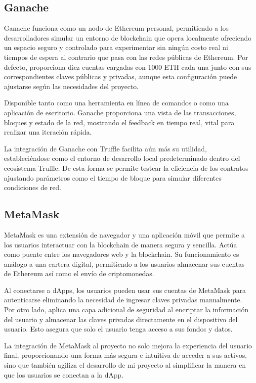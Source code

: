 \subsection{Ganache}

Ganache funciona como un nodo de Ethereum personal, permitiendo a los desarrolladores simular un entorno de blockchain que opera localmente ofreciendo un espacio seguro y controlado para experimentar sin ningún costo real ni tiempos de espera al contrario que pasa con las redes públicas de Ethereum.
Por defecto, proporciona diez cuentas cargadas con 1000 ETH cada una junto con sus correspondientes claves públicas y privadas, aunque esta configuración puede ajustarse según las necesidades del proyecto.

Disponible tanto como una herramienta en línea de comandos o como una aplicación de escritorio. Ganache proporciona  una vista de las transacciones, bloques y estado de la red, mostrando el feedback en tiempo real, vital para realizar una iteración rápida.

La integración de Ganache con Truffle facilita aún más su utilidad, estableciéndose como el entorno de desarrollo local predeterminado dentro del ecosistema Truffle.
De esta forma se permite testear la eficiencia de los contratos ajustando parámetros como el tiempo de bloque para simular diferentes condiciones de red.


\subsection{MetaMask}

MetaMask es una extensión de navegador y una aplicación móvil que permite a los usuarios interactuar con la blockchain de manera segura y sencilla. Actúa como puente entre los navegadores web y la blockchain.
Su funcionamiento es análogo a una cartera digital, permitiendo a los usuarios almacenar sus cuentas de Ethereum así como el envío de criptomonedas.

Al conectarse a dApps, los usuarios pueden usar sus cuentas de MetaMask para autenticarse eliminando la necesidad de ingresar claves privadas manualmente. Por otro lado, aplica una capa adicional de seguridad al encriptar la información del usuario y almacenar las claves privadas directamente en el dispositivo del usuario. Esto asegura que solo el usuario tenga acceso a sus fondos y datos.

La integración de MetaMask al proyecto no solo mejora la experiencia del usuario final, proporcionando una forma más segura e intuitiva de acceder a sus activos, sino que también agiliza el desarrollo de mi proyecto al simplificar la manera en que los usuarios se conectan a la dApp.


